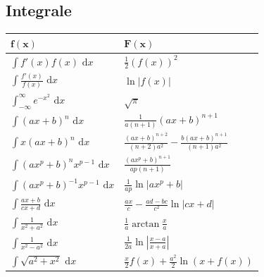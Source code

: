 \documentclass[a4paper,10pt]{article}
\def\dx{\text{ d}x}
\begin{document}
				\subsection{Integrale}
				\begin{center}
					\begin{tabularx}{\linewidth}{>{\centering\arraybackslash}X>{\centering\arraybackslash}X}
						\toprule
						$\mathbf{f(x)}$                      & $\mathbf{F(x)}$                                                  \\
						\midrule
						$\int f'(x) f(x) \dx$                & $\frac{1}{2}(f(x))^2$                                            \\
						$\int \frac{f'(x)}{f(x)} \dx$        & $\ln|f(x)|$                                                      \\
						$\int_{-\infty}^\infty e^{-x^2} \dx$ & $\sqrt{\pi}$                                                     \\
						$\int (ax+b)^n \dx$                  & $\frac{1}{a(n+1)}(ax+b)^{n+1}$                                   \\
						$\int x(ax+b)^n \dx$                 & $\frac{(ax+b)^{n+2}}{(n+2)a^2} - \frac{b(ax+b)^{n+1}}{(n+1)a^2}$ \\
						$\int (ax^p+b)^n x^{p-1} \dx$        & $\frac{(ax^p+b)^{n+1}}{ap(n+1)}$                                 \\
						$\int (ax^p + b)^{-1} x^{p-1} \dx$   & $\frac{1}{ap} \ln |ax^p + b|$                                    \\
						$\int \frac{ax+b}{cx+d} \dx$         & $\frac{ax}{c} - \frac{ad-bc}{c^2} \ln |cx +d|$                   \\
						$\int \frac{1}{x^2+a^2} \dx$         & $\frac{1}{a} \arctan \frac{x}{a}$                                \\
						$\int \frac{1}{x^2 - a^2} \dx$       & $\frac{1}{2a} \ln\left| \frac{x-a}{x+a} \right|$                 \\
						$\int \sqrt{a^2+x^2} \dx $           & $\frac{x}{2}f(x) + \frac{a^2}{2}\ln(x+f(x))$                     \\
						\bottomrule
					\end{tabularx}
				\end{center}
				
\end{document}
